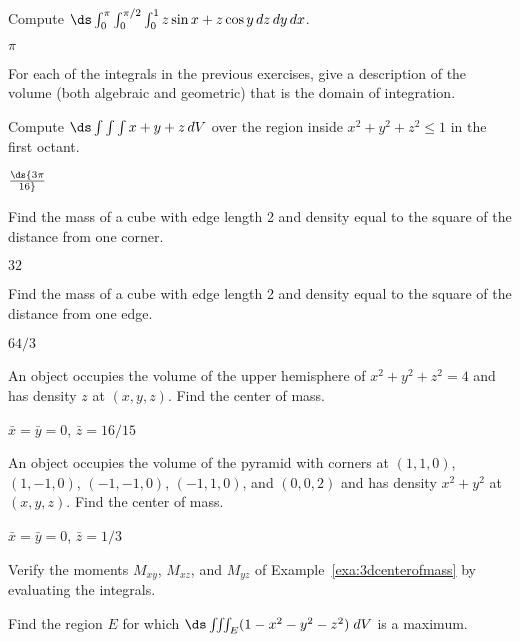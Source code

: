 \begin{enumialphparenastyle}
\begin{ex}
Compute $\ds
\int_0^\pi\int_0^{\pi/2}\int_0^1 z\sin x+z\cos y\,dz\,dy\,dx$.
\begin{sol}
$\pi$
\end{sol}
\end{ex}

\begin{ex}
For each of the integrals in the previous exercises, give a
description of the volume (both algebraic and geometric) that is the
domain of integration.
\end{ex}

\begin{ex}
Compute $\ds\int\int\int
x+y+z\,dV$ over the region inside
$x^2+y^2+z^2\le 1$ in the first octant.
\begin{sol}
$\ds {3\pi\over16}$
\end{sol}
\end{ex}

\begin{ex}
Find the mass of a cube with edge length 2 and density equal
to the square of the distance from one corner.
\begin{sol}
$32$
\end{sol}
\end{ex}

\begin{ex}
Find the mass of a cube with edge length 2 and density equal
to the square of the distance from one edge.
\begin{sol}
$64/3$
\end{sol}
\end{ex}

\begin{ex}
An object occupies the volume of the upper hemisphere of 
$x^2+y^2+z^2=4$ and has density $z$ at $(x,y,z)$. Find the center of mass.
\begin{sol}
$\bar x=\bar y=0$, $\bar z=16/15$
\end{sol}
\end{ex}

\begin{ex}
An object occupies the volume of the pyramid with corners at 
$(1,1,0)$, $(1,-1,0)$, $(-1,-1,0)$, $(-1,1,0)$, and $(0,0,2)$ and has
density $x^2+y^2$ at $(x,y,z)$. Find the center of mass.
\begin{sol}
$\bar x=\bar y=0$, $\bar z=1/3$
\end{sol}
\end{ex}

\begin{ex}
Verify the moments $M_{xy}$, $M_{xz}$, and $M_{yz}$
of Example~\ref{exa:3dcenterofmass} by evaluating the
integrals. 
\end{ex}

\begin{ex}
Find the region $E$ for which $\ds\iiint_E
  (1-x^2-y^2-z^2) \; dV$ is a maximum.
\end{ex}

\end{enumialphparenastyle}
